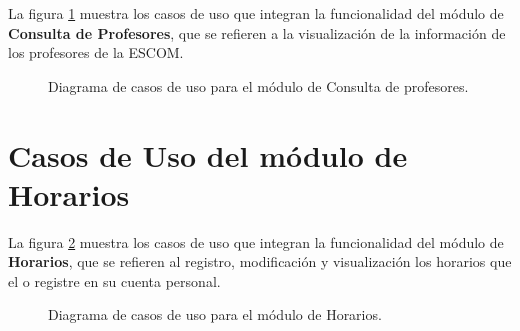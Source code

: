 La figura \ref{fig:casosUso:generacionCalendario} muestra los casos de uso que integran la funcionalidad del módulo de \textbf{Consulta de Profesores}, que se refieren a la visualización de la información de los profesores de la ESCOM.

\begin{figure}[h!]
	\begin{center}
		\caption{Diagrama de casos de uso para el módulo de Consulta de profesores. \label{fig:casosUso:generacionCalendario}}
	\end{center}
\end{figure}

\section{Casos de Uso del módulo de Horarios}

La figura \ref{fig:casosUso:generacionConvocatoria} muestra los casos de uso que integran la funcionalidad del módulo de \textbf{Horarios}, que se refieren al registro, modificación y visualización los horarios que el  o   registre en su cuenta personal.

\begin{figure}[h!]
	\begin{center}
		\caption{Diagrama de casos de uso para el módulo de Horarios. \label{fig:casosUso:generacionConvocatoria}}
	\end{center}
\end{figure}

